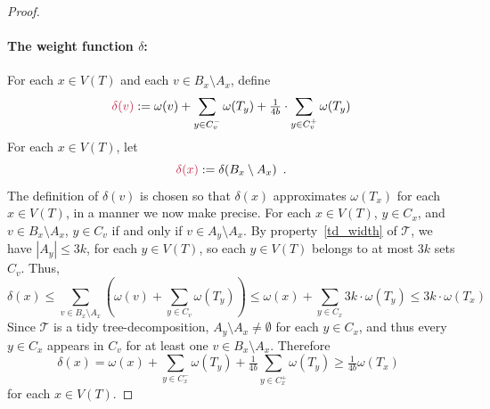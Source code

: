 \begin{proof}
  \paragraph{\boldmath The weight function $\delta$:} 
  For each $x\in V(T)$ and each $v\in B_x\setminus A_x$, define 
  \[
    \mathdefin{\delta(v)} := \omega(v)+\sum_{y\in C^-_v} \omega(T_y) + \tfrac{1}{4b}\cdot\sum_{y\in C^+_v}\omega(T_y)
  \]
  For each $x\in V(T)$, let 
  \[
    \mathdefin{\delta(x)}:=\delta(B_x\setminus A_x) \enspace . 
  \]
  The definition of $\delta(v)$ is chosen so that $\delta(x)$ approximates $\omega(T_x)$ for each $x\in V(T)$, in a manner we now make precise.
  For each $x\in V(T)$, $y\in C_x$, and $v\in B_x\setminus A_x$, $y\in C_v$ if and only if $v\in A_y\setminus A_x$.  By property~\ref{td_width} of $\mathcal{T}$, we have $|A_y|\le 3k$, for each $y\in V(T)$, so each $y\in V(T)$ belongs to at most $3k$ sets $C_v$. Thus, 
  \begin{equation}
    \delta(x) 
    \le  \sum_{v\in B_x\setminus A_x}\left(\omega(v)+ \sum_{y\in C_v} \omega(T_y) \right) 
    \le \omega(x) + \sum_{y\in C_x} 3k\cdot\omega(T_y) \le 3k\cdot\omega(T_x)
    \label{delta_x_upper_bound}
  \end{equation}
  Since $\mathcal{T}$ is a tidy tree-decomposition, $A_y\setminus A_x\neq\emptyset$ for each $y\in C_x$, and thus every $y \in C_x$ appears in $C_v$ for at least one $v \in B_x \setminus A_x$.  Therefore
  \begin{equation}
    \delta(x) = \omega(x) + \sum_{y\in C^-_x} \omega(T_y) + \tfrac{1}{4b}\sum_{y\in C^+_x} \omega(T_y)
    \ge \tfrac{1}{4b}\omega(T_x) \enspace \label{delta_y_lower_bound}
  \end{equation}
  for each $x\in V(T)$.


\end{proof}
